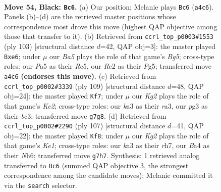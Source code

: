 \documentclass[11pt]{article}
\begin{document}
\clearpage

\begin{figure}[p]\centering
\begin{subfigure}{0.46\textwidth}\centering
\resizebox{\linewidth}{!}{%
\newchessgame
\chessboard[
  setfen={3r4/6k1/1p6/p1p5/b1N5/K1P3PN/4rp1P/7R b - - 5 54},
  showmover=false,
  pgfstyle=straightmove, color=movearrow, markmove={a4-c6}
]}
\caption{}
\end{subfigure}\hfill
\begin{subfigure}{0.46\textwidth}\centering
\resizebox{\linewidth}{!}{%
\newchessgame
\chessboard[
  setfen={5k2/p7/1p2N2p/2r3pP/6b1/P1pK4/2P3P1/4R3 b - - 3 52},
  showmover=false,
  pgfstyle=straightmove, color=movearrow, markmove={g4-e6}
]}
\caption{}
\end{subfigure}
\\[4pt]
\begin{subfigure}{0.46\textwidth}\centering
\resizebox{\linewidth}{!}{%
\newchessgame
\chessboard[
  setfen={8/4k3/5p2/4p1p1/6N1/RbBK1PPp/p6P/2r5 b - - 13 55},
  showmover=false,
  pgfstyle=straightmove, color=movearrow, markmove={e7-f7}
]}
\caption{}
\end{subfigure}\hfill
\begin{subfigure}{0.46\textwidth}\centering
\resizebox{\linewidth}{!}{%
\newchessgame
\chessboard[
  setfen={4k3/7R/3p2rn/2pPp2p/4N2P/3K2P1/1P6/8 b - - 23 54},
  showmover=false,
  pgfstyle=straightmove, color=movearrow, markmove={e8-f8}
]}
\caption{}
\end{subfigure}
\caption{\textbf{Move 54, Black: \texttt{Bc6}.} (a) Our position; Melanie plays \texttt{Bc6} (\texttt{a4c6}). Panels (b)--(d) are the retrieved master positions whose correspondence most drove this move (highest QAP objective among those that transfer to it). (b) Retrieved from \texttt{ccrl\_top\_p0003\#1553} (ply 103) [structural distance $d$=42, QAP obj=3]: the master played \texttt{Bxe6}; under $\mu$ our \emph{Ba5} plays the role of that game's \emph{Bg5}; cross-type roles: our \emph{P}a5 as their \emph{R}c5, our \emph{R}e2 as their \emph{P}g5; transferred move \texttt{a4c6} \textbf{(endorses this move)}. (c) Retrieved from \texttt{ccrl\_top\_p0002\#3339} (ply 109) [structural distance $d$=48, QAP obj=24]: the master played \texttt{Kf7}; under $\mu$ our \emph{Kg2} plays the role of that game's \emph{Ke2}; cross-type roles: our \emph{k}a3 as their \emph{r}a3, our \emph{p}g3 as their \emph{b}c3; transferred move \texttt{g7g8}. (d) Retrieved from \texttt{ccrl\_top\_p0002\#2290} (ply 107) [structural distance $d$=41, QAP obj=22]: the master played \texttt{Kf8}; under $\mu$ our \emph{Kg2} plays the role of that game's \emph{Ke1}; cross-type roles: our \emph{k}a3 as their \emph{r}h7, our \emph{B}a4 as their \emph{N}h6; transferred move \texttt{g7h7}. Synthesis: 1 retrieved analog transferred to \texttt{Bc6} (summed QAP objective 3, the strongest correspondence among the candidate moves); Melanie committed it via the \texttt{search} selector.}
\label{fig:thought-m107}
\end{figure}
\end{document}
